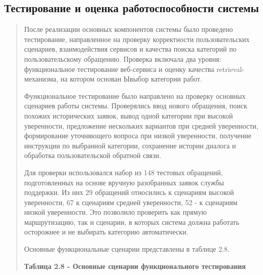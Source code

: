 \documentclass[
]{article}
\begin{document}
\hypertarget{ux442ux435ux441ux442ux438ux440ux43eux432ux430ux43dux438ux435-ux438-ux43eux446ux435ux43dux43aux430-ux440ux430ux431ux43eux442ux43eux441ux43fux43eux441ux43eux431ux43dux43eux441ux442ux438-ux441ux438ux441ux442ux435ux43cux44b}{%
\subsection{\texorpdfstring{ Тестирование и оценка работоспособности
системы}{ Тестирование и оценка работоспособности системы}}\label{ux442ux435ux441ux442ux438ux440ux43eux432ux430ux43dux438ux435-ux438-ux43eux446ux435ux43dux43aux430-ux440ux430ux431ux43eux442ux43eux441ux43fux43eux441ux43eux431ux43dux43eux441ux442ux438-ux441ux438ux441ux442ux435ux43cux44b}}

\begin{quote}
После реализации основных компонентов системы было проведено
тестирование, направленное на проверку корректности пользовательских
сценариев, взаимодействия сервисов и качества поиска категорий по
пользовательскому обращению. Проверка включала два уровня:
функциональное тестирование веб-сервиса и оценку качества
retrieval-механизма, на котором основан Ывыбор категории работ.

Функциональное тестирование было направлено на проверку основных
сценариев работы системы. Проверялись ввод нового обращения, поиск
похожих исторических заявок, вывод одной категории при высокой
уверенности, предложение нескольких вариантов при средней уверенности,
формирование уточняющего вопроса при низкой уверенности, получение
инструкции по выбранной категории, сохранение истории диалога и
обработка пользовательской обратной связи.

Для проверки использовался набор из 148 тестовых обращений,
подготовленных на основе вручную разобранных заявок службы поддержки. Из
них 29 обращений относились к сценариям высокой уверенности, 67 к
сценариям средней уверенности, 52 - к сценариям низкой уверенности. Это
позволило проверить как прямую маршрутизацию, так и сценарии, в которых
система должна работать осторожнее и не выбирать категорию
автоматически.

Основные функциональные сценарии представлены в таблице 2.8.

\textbf{Таблица 2.8 - Основные сценарии функционального тестирования}
\end{quote}
\end{document}
